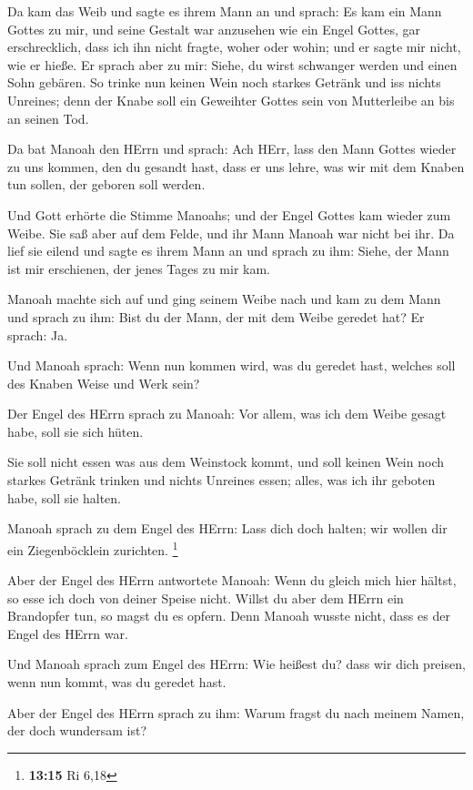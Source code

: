  Da kam das Weib und sagte es ihrem Mann an und sprach: Es
kam ein Mann Gottes zu mir, und seine Gestalt war anzusehen wie ein
Engel Gottes, gar erschrecklich, dass ich ihn nicht fragte, woher oder
wohin; und er sagte mir nicht, wie er hieße.  Er sprach aber
zu mir: Siehe, du wirst schwanger werden und einen Sohn gebären. So
trinke nun keinen Wein noch starkes Getränk und iss nichts Unreines;
denn der Knabe soll ein Geweihter Gottes sein von Mutterleibe an bis an
seinen Tod.

 Da bat Manoah den HErrn und sprach: Ach HErr, lass den Mann
Gottes wieder zu uns kommen, den du gesandt hast, dass er uns lehre, was
wir mit dem Knaben tun sollen, der geboren soll werden.

 Und Gott erhörte die Stimme Manoahs; und der Engel Gottes
kam wieder zum Weibe. Sie saß aber auf dem Felde, und ihr Mann Manoah
war nicht bei ihr.  Da lief sie eilend und sagte es ihrem
Mann an und sprach zu ihm: Siehe, der Mann ist mir erschienen, der jenes
Tages zu mir kam.

 Manoah machte sich auf und ging seinem Weibe nach und kam
zu dem Mann und sprach zu ihm: Bist du der Mann, der mit dem Weibe
geredet hat? Er sprach: Ja.

 Und Manoah sprach: Wenn nun kommen wird, was du geredet
hast, welches soll des Knaben Weise und Werk sein?

 Der Engel des HErrn sprach zu Manoah: Vor allem, was ich
dem Weibe gesagt habe, soll sie sich hüten.

 Sie soll nicht essen was aus dem Weinstock kommt, und soll
keinen Wein noch starkes Getränk trinken und nichts Unreines essen;
alles, was ich ihr geboten habe, soll sie halten.

 Manoah sprach zu dem Engel des HErrn: Lass dich doch
halten; wir wollen dir ein Ziegenböcklein zurichten. \footnote{\textbf{13:15}
  Ri 6,18}

 Aber der Engel des HErrn antwortete Manoah: Wenn du gleich
mich hier hältst, so esse ich doch von deiner Speise nicht. Willst du
aber dem HErrn ein Brandopfer tun, so magst du es opfern. Denn Manoah
wusste nicht, dass es der Engel des HErrn war.

 Und Manoah sprach zum Engel des HErrn: Wie heißest du?
dass wir dich preisen, wenn nun kommt, was du geredet hast.

 Aber der Engel des HErrn sprach zu ihm: Warum fragst du
nach meinem Namen, der doch wundersam ist?

